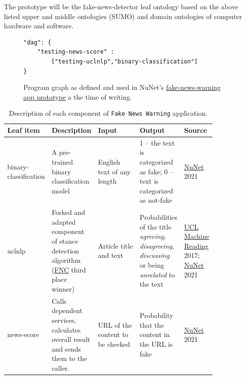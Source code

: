 \documentclass[]{report}
\begin{document}
The prototype will be the fake-news-detector leaf ontology based on the above listed upper and middle ontologies (SUMO) and domain ontologies of computer hardware and software.

\begin{figure}[h]
\begin{verbatim}
"dag": {
	"testing-news-score" :
		["testing-uclnlp","binary-classification"]
}
\end{verbatim}
\caption{\label{lst:dag}Program graph as defined and used in NuNet's \href{https://gitlab.com/nunet/fake-news-detection/fake\_news\_score/-/blob/master/service/dag.json}{fake-news-warning app prototype} a the time of writing.}
\end{figure}


\begin{table}[h]
  \scriptsize
  \centering
	\begin{tabular}{p{0.15\linewidth}|p{0.2\linewidth}|p{0.2\linewidth}|p{0.2\linewidth}|p{0.1\linewidth}}
	\textbf{Leaf item} & \textbf{Description} & \textbf{Input} & \textbf{Output} & \textbf{Source}\\
	\hline
	binary-classification & A pre-trained binary classification model & English text of any length & 1 -- the text is categorized as fake; 0 -- text is categorized as not-fake & \textcopyright \href{https://gitlab.com/nunet/fake-news-detection/binary-classification}{NuNet} 2021\\
    \hline
	uclnlp & Forked and adapted component of stance detection algorithm (\href{http://www.fakenewschallenge.org/#fnc1results}{FNC} third place winner) & Article title and text & Probabilities of the title \textit{agreeing}, \textit{disagreeing}, \textit{discussing} or being \textit{unrelated} to the text & \textcopyright \href{https://github.com/uclnlp/fakenewschallenge}{UCL Machine Reading} 2017; \textcopyright \href{https://gitlab.com/nunet/fake-news-detection/uclnlp}{NuNet} 2021\\
	\hline
	news-score & Calls dependent services, calculates overall result and sends them to the caller. & URL of the content to be checked & Probability that the content in the URL is fake & \textcopyright \href{https://gitlab.com/nunet/fake-news-detection/fake_news_score}{NuNet} 2021 \\
\end{tabular}
\caption{\label{tbl:fns_components}Description of each component of \texttt{Fake News Warning} application.}
\end{table}
\end{document}

